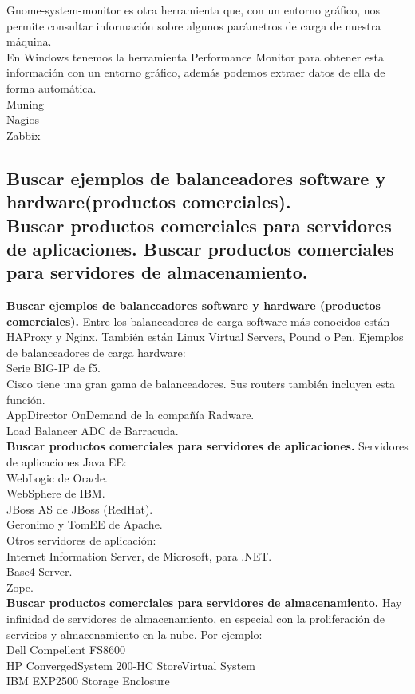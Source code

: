 Gnome-system-monitor es otra herramienta que, con un entorno gráfico, nos permite consultar información sobre algunos parámetros de carga de nuestra máquina.\\

En Windows tenemos la herramienta Performance Monitor para obtener esta información con un entorno gráfico, además podemos extraer datos de ella de forma automática.\\

Muning\\
Nagios\\
Zabbix\\

\subsection{ Buscar ejemplos de balanceadores software y hardware(productos comerciales).\\
Buscar productos comerciales para servidores de aplicaciones.
Buscar productos comerciales para servidores de almacenamiento.   
 }
\textbf{Buscar ejemplos de balanceadores software y hardware (productos comerciales).}
Entre los balanceadores de carga software más conocidos están HAProxy y Nginx. También están Linux Virtual Servers, Pound o Pen. Ejemplos de balanceadores de carga hardware:\\
Serie BIG-IP de f5.\\
Cisco tiene una gran gama de balanceadores. Sus routers también incluyen esta función.\\
AppDirector OnDemand de la compañía Radware.\\
Load Balancer ADC de Barracuda.\\
\textbf{ Buscar productos comerciales para servidores de aplicaciones. }
Servidores de aplicaciones Java EE:\\
WebLogic de Oracle.\\
WebSphere de IBM.\\
JBoss AS de JBoss (RedHat).\\
Geronimo y TomEE de Apache.\\

Otros servidores de aplicación:\\
Internet Information Server, de Microsoft, para .NET.\\
Base4 Server.\\
Zope.\\
\textbf{ Buscar productos comerciales para servidores de almacenamiento. }
Hay infinidad de servidores de almacenamiento, en especial con la proliferación de servicios y almacenamiento en la nube. Por ejemplo:\\
Dell Compellent FS8600\\
HP ConvergedSystem 200-HC StoreVirtual System\\
IBM EXP2500 Storage Enclosure\\

